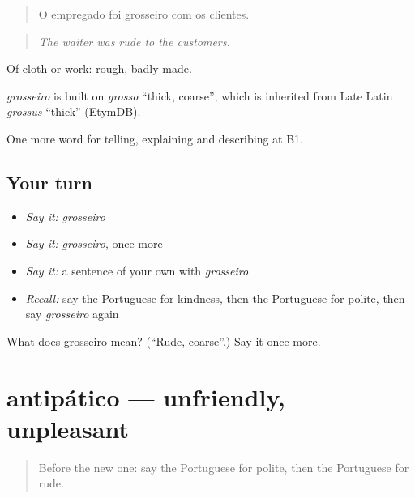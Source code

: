 \begin{quote}
O empregado foi grosseiro com os clientes.
\end{quote}

\begin{quote}
\emph{The waiter was rude to the customers.}
\end{quote}

Of cloth or work: rough, badly made.

\begin{cousinweb}
\emph{grosseiro} is built on \emph{grosso} \textquotedblleft{}thick, coarse\textquotedblright{}, which is inherited from Late Latin \emph{grossus} \textquotedblleft{}thick\textquotedblright{} (EtymDB).
\end{cousinweb}

\begin{grammarlens}[title={What you've built}]
One more word for telling, explaining and describing at B1.
\end{grammarlens}

\subsection*{Your turn}
\begin{itemize}
\raggedright
  \item \emph{Say it:} \emph{grosseiro}
  \item \emph{Say it:} \emph{grosseiro}, once more
  \item \emph{Say it:} a sentence of your own with \emph{grosseiro}
  \item \emph{Recall:} say the Portuguese for kindness, then the Portuguese for polite, then say \emph{grosseiro} again
\end{itemize}

\begin{tcolorbox}[breakable,colback=teal!4,colframe=teal!35!black,title={Before you move on}]
What does grosseiro mean? (\textquotedblleft{}Rude, coarse\textquotedblright{}.) Say it once more.
\end{tcolorbox}
\section[antipático]{antipático — unfriendly, unpleasant}

\label{lesson:PT-C473-antipatico}



\begin{quote}
Before the new one: say the Portuguese for polite, then the Portuguese for rude.
\end{quote}

